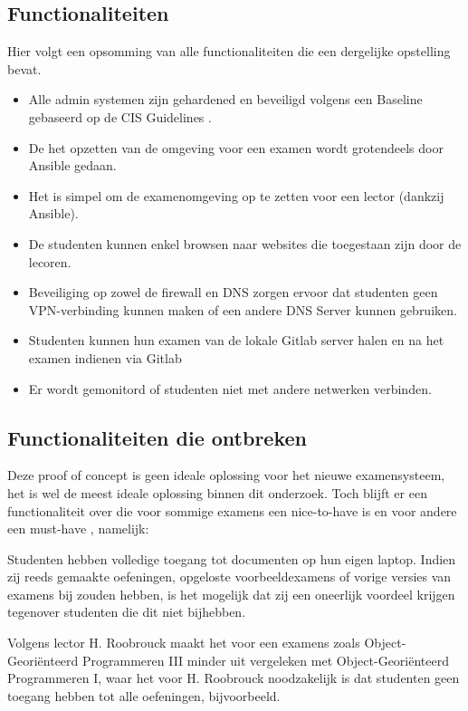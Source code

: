 \subsection{Functionaliteiten}

Hier volgt een opsomming van alle functionaliteiten die een dergelijke opstelling bevat.

\begin{itemize}
	\item Alle admin systemen zijn gehardened en beveiligd volgens een Baseline gebaseerd op de CIS Guidelines \autocite{Baseline2019}.
	\item De het opzetten van de omgeving voor een examen wordt grotendeels door Ansible gedaan.
	\item Het is simpel om de examenomgeving op te zetten voor een lector (dankzij Ansible). 
	\item De studenten kunnen enkel browsen naar websites die toegestaan zijn door de lecoren.
	\item Beveiliging op zowel de firewall en DNS zorgen ervoor dat studenten geen VPN-verbinding kunnen maken of een andere DNS Server kunnen gebruiken.
	\item Studenten kunnen hun examen van de lokale Gitlab server halen en na het examen indienen via Gitlab
	\item Er wordt gemonitord of studenten niet met andere netwerken verbinden.
\end{itemize}

\subsection{Functionaliteiten die ontbreken}

Deze proof of concept is geen ideale oplossing voor het nieuwe examensysteem, het is wel de meest ideale oplossing binnen dit onderzoek.
Toch blijft er een functionaliteit over die voor sommige examens een nice-to-have is en voor andere een must-have \autocite{Roobrouck2019}, namelijk: 

Studenten hebben volledige toegang tot documenten op hun eigen laptop. Indien zij reeds gemaakte oefeningen, opgeloste voorbeeldexamens of vorige versies van examens bij zouden hebben, is het mogelijk dat zij een oneerlijk voordeel krijgen tegenover studenten die dit niet bijhebben. 

 Volgens lector H. Roobrouck maakt het voor een examens zoals Object-Geori\"{e}nteerd Programmeren III minder uit vergeleken met Object-Geori\"{e}nteerd Programmeren I, waar het voor H. Roobrouck noodzakelijk is dat studenten geen toegang hebben tot alle oefeningen, bijvoorbeeld.

